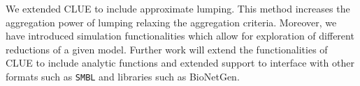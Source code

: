 
We extended CLUE\cite{ovchinnikov_clue_2021,jimenez_clue_2022} to include approximate lumping.
This method increases the aggregation power of lumping relaxing the aggregation criteria.
Moreover, we have introduced simulation functionalities which allow for exploration of different reductions of a given model.
Further work will extend the functionalities of CLUE to include analytic functions and extended support to interface with other formats such as \texttt{SMBL} and libraries such as BioNetGen.

